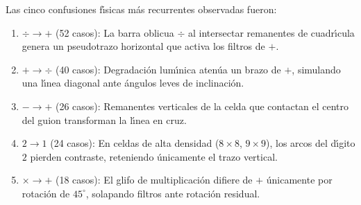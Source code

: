 Las cinco confusiones f\'{\i}sicas m\'as recurrentes observadas fueron:
\begin{enumerate}
    \item $\div \to +$ (52 casos): La barra oblicua $\div$ al intersectar remanentes de cuadr\'{\i}cula genera un pseudotrazo horizontal que activa los filtros de $+$.
    \item $+ \to \div$ (40 casos): Degradaci\'on lum\'{\i}nica aten\'ua un brazo de $+$, simulando una l\'{\i}nea diagonal ante \'angulos leves de inclinaci\'on.
    \item $- \to +$ (26 casos): Remanentes verticales de la celda que contactan el centro del guion transforman la l\'{\i}nea en cruz.
    \item $2 \to 1$ (24 casos): En celdas de alta densidad ($8\times8$, $9\times9$), los arcos del d\'{\i}gito $2$ pierden contraste, reteniendo \'unicamente el trazo vertical.
    \item $\times \to +$ (18 casos): El glifo de multiplicaci\'on difiere de $+$ \'unicamente por rotaci\'on de $45^\circ$, solapando filtros ante rotaci\'on residual.
\end{enumerate}

